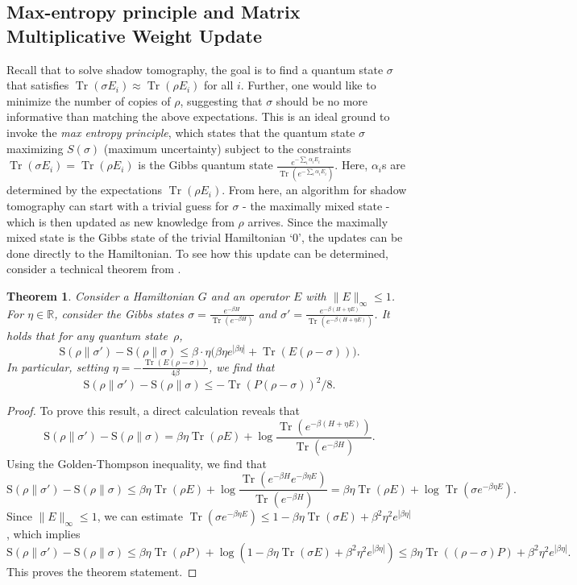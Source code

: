 \documentclass[11pt]{article}
\newcommand{\R}{\ensuremath{\mathbb{R}}}
\DeclareMathOperator{\tr}{Tr}
\newcommand{\relent}[2]{\mathrm{S}\left(#1\|#2\right)}
\newtheorem{theorem}{Theorem}
\begin{document}
\subsection{Max-entropy principle and Matrix Multiplicative Weight Update}
Recall that to solve shadow tomography, the goal is to find a quantum state $\sigma$ that satisfies $\tr(\sigma E_i)\approx \tr(\rho E_i)$ for all $i$. Further, one would like to minimize the number of copies of $\rho$, suggesting that $\sigma$ should be no more informative than matching the above expectations. This is an ideal ground to invoke the \emph{max entropy principle}, which states that the quantum state $\sigma$ maximizing $S(\sigma)$ (maximum uncertainty) subject to the constraints $\tr(\sigma E_i)= \tr(\rho E_i)$ is the Gibbs quantum state $\frac{e^{-\sum_i \alpha_i E_i}}{\tr(e^{-\sum_i \alpha_i E_i})}$. Here, $\alpha_i$s are determined by the expectations $\tr(\rho E_i)$. From here, an algorithm for shadow tomography can start with a trivial guess for $\sigma$ - the maximally mixed state - which is then updated as new knowledge from $\rho$ arrives. Since the maximally mixed state is the Gibbs state of the trivial Hamiltonian `$0$', the updates can be done directly to the Hamiltonian. To see how this update can be determined, consider a technical theorem from \cite{FBK21}.
\begin{theorem}
    Consider a Hamiltonian $G$ and an operator $E$ with $\|E\|_\infty\leq 1$. For $\eta\in \R$, consider the Gibbs states $\sigma=\frac{e^{-\beta H}}{\tr(e^{-\beta H})}$ and $\sigma'=\frac{e^{-\beta (H+\eta E)}}{\tr(e^{-\beta (H+\eta E)})}$. It holds that for any quantum state~$\rho$, 
$$
\relent{\rho}{\sigma'} - \relent{\rho}{\sigma}\leq \beta\cdot \eta\Big(\beta\eta e^{|\beta\eta|} + \tr(E(\rho-\sigma))\Big).
$$ 
In particular, setting $\eta= -\frac{\tr(E(\rho-\sigma))}{4\beta}$, we find that  
$$
\relent{\rho}{\sigma'} - \relent{\rho}{\sigma}\leq -\tr(P(\rho-\sigma))^2/8.
$$
\end{theorem}
\begin{proof}
To prove this result, a direct calculation reveals that $$\relent{\rho}{\sigma'} - \relent{\rho}{\sigma}=\beta\eta\tr(\rho E)+\log\frac{\tr(e^{-\beta (H+\eta E)})}{\tr(e^{-\beta H})}.$$ Using the Golden-Thompson inequality, we find that 
$$\relent{\rho}{\sigma'} - \relent{\rho}{\sigma}\leq\beta\eta\tr(\rho E)+\log\frac{\tr(e^{-\beta H}e^{-\beta\eta E})}{\tr(e^{-\beta H})}=\beta\eta\tr(\rho E)+\log\tr(\sigma e^{-\beta\eta E}).$$
Since $\|E\|_\infty \leq 1$, we can estimate $\tr(\sigma e^{-\beta\eta E})\leq 1-\beta\eta\tr(\sigma E) + \beta^2\eta^2 e^{|\beta\eta|}$, which implies 
$$\relent{\rho}{\sigma'} - \relent{\rho}{\sigma}\leq\beta\eta\tr(\rho P)+\log(1-\beta\eta\tr(\sigma E) + \beta^2\eta^2 e^{|\beta\eta|})\leq \beta\eta\tr((\rho-\sigma) P) + \beta^2\eta^2e^{|\beta\eta|}.
$$
This proves the theorem statement.  
\end{proof}
\end{document}

